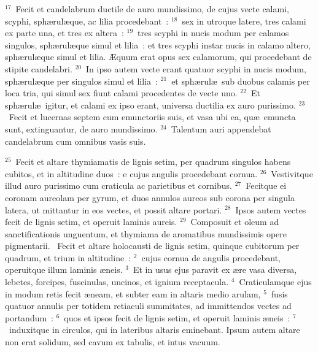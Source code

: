 ${}^{17}$~Fecit et candelabrum ductile de auro mundissimo, de cujus vecte calami, scyphi, sph\ae rul\ae que, ac lilia procedebant~:
${}^{18}$~sex in utroque latere, tres calami ex parte una, et tres ex altera~:
${}^{19}$~tres scyphi in nucis modum per calamos singulos, sph\ae rul\ae que simul et lilia~: et tres scyphi instar nucis in calamo altero, sph\ae rul\ae que simul et lilia. \AE quum erat opus sex calamorum, qui procedebant de stipite candelabri.
${}^{20}$~In ipso autem vecte erant quatuor scyphi in nucis modum, sph\ae rul\ae que per singulos simul et lilia~:
${}^{21}$~et sph\ae rul\ae\ sub duobus calamis per loca tria, qui simul sex fiunt calami procedentes de vecte uno.
${}^{22}$~Et sph\ae rul\ae\ igitur, et calami ex ipso erant, universa ductilia ex auro purissimo.
${}^{23}$~Fecit et lucernas septem cum emunctoriis suis, et vasa ubi ea, qu\ae\ emuncta sunt, extinguantur, de auro mundissimo.
${}^{24}$~Talentum auri appendebat candelabrum cum omnibus vasis suis.


${}^{25}$~Fecit et altare thymiamatis de lignis setim, per quadrum singulos habens cubitos, et in altitudine duos~: e cujus angulis procedebant cornua.
${}^{26}$~Vestivitque illud auro purissimo cum craticula ac parietibus et cornibus.
${}^{27}$~Fecitque ei coronam aureolam per gyrum, et duos annulos aureos sub corona per singula latera, ut mittantur in eos vectes, et possit altare portari.
${}^{28}$~Ipsos autem vectes fecit de lignis setim, et operuit laminis aureis.
${}^{29}$~Composuit et oleum ad sanctificationis unguentum, et thymiama de aromatibus mundissimis opere pigmentarii.
~\lettrine[lines=10,image=true,loversize=0.05,lraise=-0.03]{F}{}ecit et altare holocausti de lignis setim, quinque cubitorum per quadrum, et trium in altitudine~:
${}^{2}$~cujus cornua de angulis procedebant, operuitque illum laminis \ae neis.
${}^{3}$~Et in usus ejus paravit ex \ae re vasa diversa, lebetes, forcipes, fuscinulas, uncinos, et ignium receptacula.
${}^{4}$~Craticulamque ejus in modum retis fecit \ae neam, et subter eam in altaris medio arulam,
${}^{5}$~fusis quatuor annulis per totidem retiaculi summitates, ad immittendos vectes ad portandum~:
${}^{6}$~quos et ipsos fecit de lignis setim, et operuit laminis \ae neis~:
${}^{7}$~induxitque in circulos, qui in lateribus altaris eminebant. Ipsum autem altare non erat solidum, sed cavum ex tabulis, et intus vacuum.


